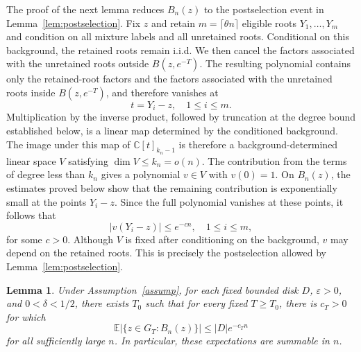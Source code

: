 \documentclass[10pt,reqno]{amsart}
\newtheorem{lemma}[theorem]{Lemma}
\theoremstyle{remark}
\newcommand{\C}{\mathbb C}
\newcommand{\E}{\mathbb E}
\begin{document}
The proof of the next lemma reduces $B_n(z)$ to the postselection event in Lemma~\ref{lem:postselection}. Fix $z$ and retain $m=\lceil \theta n\rceil$ eligible roots $Y_1,\ldots, Y_m$ and condition on all mixture labels and all unretained roots. Conditional on this background, the retained roots remain i.i.d. We then cancel the factors associated with the unretained roots outside $B(z,e^{-T})$. The resulting polynomial contains only the retained-root factors and the factors associated with the unretained roots inside $B(z,e^{-T})$, and therefore vanishes at 
\[t=Y_i-z,\quad 1\le i\le m.\]
Multiplication by the inverse product, followed by truncation at the degree bound established below, is a linear map determined by the conditioned background. The image under this map of $\C[t]_{k_n-1}$ is therefore a background-determined linear space $V$ satisfying $\dim V\le k_n=o(n)$. The contribution from the terms of degree less than $k_n$ gives a polynomial $v\in V$ with $v(0)=1$. On $B_n(z)$, the estimates proved below show that the remaining contribution is exponentially small at the points $Y_i-z$. Since the full polynomial vanishes at these points, it follows that 
\[|v(Y_i-z)|\le e^{-cn}, \quad 1\le i\le m,\]
for some $c>0$. Although $V$ is fixed after conditioning on the background, $v$ may depend on the retained roots. This is precisely the postselection allowed by Lemma~\ref{lem:postselection}.

\begin{lemma}\label{lem:summable}
    Under Assumption~\ref{assump}, for each fixed bounded disk $D$, $\varepsilon>0$, and $0<\delta<1/2$, there exists $T_0$ such that for every fixed $T\ge T_0$, there is $c_T>0$ for which 
    \[\E|\{z\in G_T:B_n(z)\}|\le |D|e^{-c_T n}\]
    for all sufficiently large $n$. In particular, these expectations are summable in $n$.
\end{lemma}
\end{document}
